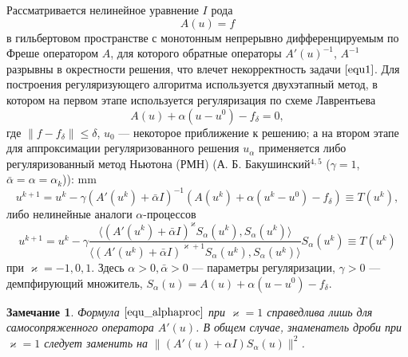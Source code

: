 \documentclass[%
autoref,     %
href,        %
facsimile,   %
colorlinks,  %
]{disser}
\newtheorem{remark}{Замечание}
\begin{document}
Рассматривается нелинейное уравнение $I$ рода
\begin{equation}\label{equ1}A(u)=f\end{equation}
в гильбертовом пространстве с монотонным непрерывно дифференцируемым по Фреше оператором $A$, для которого обратные операторы $A'(u)^{-1}$, $A^{-1}$ разрывны в окрестности решения, что влечет некорректность задачи $\eqref{equ1}$. Для построения регуляризующего алгоритма используется двухэтапный метод, в котором на первом этапе используется регуляризация по схеме Лаврентьева
\begin{equation}\label{equ2}A(u)+\alpha(u-u^0)-f_\delta=0,\end{equation}
где $\|f-f_\delta\|\leqslant\delta$, $u_0$ --- некоторое приближение к решению; а на втором этапе для аппроксимации регуляризованного решения $u_\alpha$ применяется либо регуляризованный метод Ньютона (РМН) (А. Б. Бакушинский$^{4,5}$ ($\gamma=1$, $\bar{\alpha}=\alpha=\alpha_k$)):
 mm
{\scriptsize
	\let\thefootnote\relax\let\thefootnote\relax{}
	\let\thefootnote\relax\let\thefootnote\relax{}
}
\begin{equation}\label{equ_rmn}
u^{k+1}=u^k-\gamma(A'(u^k)+\bar\alpha I)^{-1}(A(u^k)+\alpha(u^k-u^0)-f_\delta)\equiv{T(u^k)},
\end{equation}
либо нелинейные аналоги $\alpha$-процессов
\begin{equation}\label{equ_alphaproc}
u^{k+1}=u^k-\gamma\frac{\langle (A'(u^k)+\bar\alpha I)^{\varkappa}S_\alpha(u^k), S_\alpha(u^k)\rangle }{\langle(A'(u^k)+\bar\alpha I)^{\varkappa+1}S_\alpha(u^k), S_\alpha(u^k)\rangle }S_\alpha(u^k)\equiv{T(u^k)}
\end{equation}
при $\varkappa=-1,0,1$. Здесь $\alpha>0, \bar\alpha>0$ --- параметры регуляризации, $\gamma>0$ --- демпфирующий множитель, $S_\alpha(u)=A(u)+\alpha(u-u^0)-f_\delta$.
\begin{remark}
	Формула $\eqref{equ_alphaproc}$ при $\varkappa=1$ справедлива лишь для самосопряженного оператора $A'(u)$. В общем случае, знаменатель дроби при $\varkappa=1$ следует заменить на $\|(A'(u)+\alpha I)S_\alpha (u)\|^2$.
\end{remark}
\end{document}

